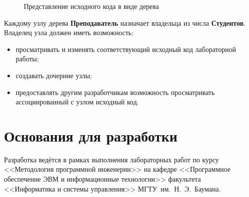 \documentclass{bmstu}
\begin{document}
  \begin{figure}[ht]
    \centering


    \caption{Представление исходного кода в виде дерева}
    \label{fig:source-code-tree}
  \end{figure}

  \FloatBarrier

  Каждому узлу дерева \textbf{Преподаватель} назначает владельца из числа
  \textbf{Студентов}.
  Владелец узла должен иметь возможность:
  \begin{itemize}[label=---]
    \item просматривать и изменять соответствующий исходный код
      лабораторной работы;
    \item создавать дочерние узлы;
    \item предоставлять другим разработчикам возможность просматривать
      ассоциированный с узлом исходный код.
  \end{itemize}

  \section{Основания для разработки}

  Разработка ведётся в рамках выполнения лабораторных работ по курсу
  <<Методология программной инженерии>> на кафедре <<Программное
  обеспечение ЭВМ и информационные технологии>> факультета
  <<Информатика и системы управления>> МГТУ~им.~Н.~Э.~Баумана.
\end{document}
